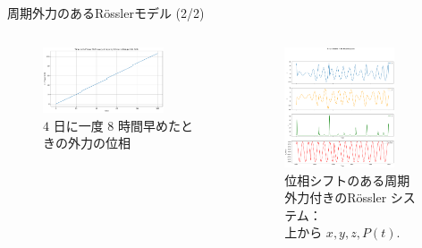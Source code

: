 \begin{frame}{周期外力のあるRösslerモデル (2/2)}
\begin{columns}[T]
\begin{column}{.5\textwidth}
            \vspace{-.5em}
            \begin{figure}
                \includegraphics[width=0.8\textwidth]{Fig/phase_shift_plot.png}
                \caption{\scriptsize{$4$ 日に一度 $8$ 時間早めたときの外力の位相}}
            \end{figure}
        \end{column}
        \begin{column}{.5\textwidth}
            \vspace{-1cm}
            \begin{figure}
                \includegraphics[width=0.8\textwidth]{Fig/NEWrossler_waves.png}
                \caption{\scriptsize{位相シフトのある周期外力付きのRössler システム：\\
                上から $x, y, z, P(t)$. }}
            \end{figure}
        \end{column}
      \end{columns}
    
\end{frame}


